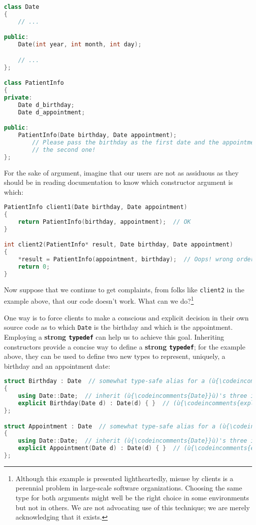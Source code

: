 \begin{lstlisting}[language=C++]
class Date
{
    // ...

public:
    Date(int year, int month, int day);

    // ...
};

class PatientInfo
{
private:
    Date d_birthday;
    Date d_appointment;

public:
    PatientInfo(Date birthday, Date appointment);
        // Please pass the birthday as the first date and the appointment as
        // the second one!
};
\end{lstlisting}

\noindent For the sake of argument, imagine that our users are not as assiduous as
they should be in reading documentation to know which constructor
argument is which:

\begin{lstlisting}[language=C++]
PatientInfo client1(Date birthday, Date appointment)
{
    return PatientInfo(birthday, appointment);  // OK
}

int client2(PatientInfo* result, Date birthday, Date appointment)
{
    *result = PatientInfo(appointment, birthday);  // Oops! wrong order
    return 0;
}
\end{lstlisting}

\noindent Now suppose that we continue to get complaints, from folks like
\texttt{client2} in the example above, that our code doesn't work. What can we
do?{\cprotect\footnote{Although this example is presented lightheartedly, misuse by clients is a perennial problem in large-scale
software organizations. Choosing the same type for both arguments
might well be the right choice in some environments but not in others.
We are not advocating use of this technique; we are merely
  acknowledging that it exists.}}

One way is to force clients to make a conscious and explicit decision in
their own source code as to which \texttt{Date} is the birthday and
which is the appointment. Employing a \textbf{strong \texttt{typedef}}
can help us to achieve this goal. Inheriting constructors provide a
concise way to define a \textbf{strong \texttt{typedef}}; for
the example above, they can be used to define two new types to
represent, uniquely, a birthday and an appointment date:

\begin{lstlisting}[language=C++]
struct Birthday : Date  // somewhat type-safe alias for a (ù{\codeincomments{Date}}ù)
{
    using Date::Date;  // inherit (ù{\codeincomments{Date}}ù)'s three integer ctor
    explicit Birthday(Date d) : Date(d) { }  // (ù{\codeincomments{explicit}}ù) conversion from (ù{\codeincomments{Date}}ù)
};

struct Appointment : Date  // somewhat type-safe alias for a (ù{\codeincomments{Date}}ù)
{
    using Date::Date;  // inherit (ù{\codeincomments{Date}}ù)'s three integer ctor
    explicit Appointment(Date d) : Date(d) { }  // (ù{\codeincomments{explicit}}ù) conv. from (ù{\codeincomments{Date}}ù)
};
\end{lstlisting}

